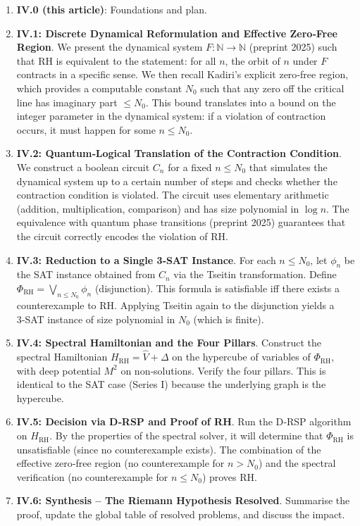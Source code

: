 \documentclass[11pt,a4paper]{article}
\begin{document}
\begin{enumerate}
\item \textbf{IV.0 (this article)}: Foundations and plan.
\item \textbf{IV.1: Discrete Dynamical Reformulation and Effective Zero‑Free Region}.  
   We present the dynamical system \(F: \mathbb{N} \to \mathbb{N}\) (preprint 2025) such that RH is equivalent to the statement: for all \(n\), the orbit of \(n\) under \(F\) contracts in a specific sense. We then recall Kadiri's explicit zero‑free region, which provides a computable constant \(N_0\) such that any zero off the critical line has imaginary part \(\le N_0\). This bound translates into a bound on the integer parameter in the dynamical system: if a violation of contraction occurs, it must happen for some \(n \le N_0\).
\item \textbf{IV.2: Quantum‑Logical Translation of the Contraction Condition}.  
   We construct a boolean circuit \(C_n\) for a fixed \(n \le N_0\) that simulates the dynamical system up to a certain number of steps and checks whether the contraction condition is violated. The circuit uses elementary arithmetic (addition, multiplication, comparison) and has size polynomial in \(\log n\). The equivalence with quantum phase transitions (preprint 2025) guarantees that the circuit correctly encodes the violation of RH.
\item \textbf{IV.3: Reduction to a Single 3‑SAT Instance}.  
   For each \(n \le N_0\), let \(\phi_n\) be the SAT instance obtained from \(C_n\) via the Tseitin transformation. Define \(\Phi_{\text{RH}} = \bigvee_{n\le N_0} \phi_n\) (disjunction). This formula is satisfiable iff there exists a counterexample to RH. Applying Tseitin again to the disjunction yields a 3‑SAT instance of size polynomial in \(N_0\) (which is finite).
\item \textbf{IV.4: Spectral Hamiltonian and the Four Pillars}.  
   Construct the spectral Hamiltonian \(H_{\text{RH}} = \hat{V} + \Delta\) on the hypercube of variables of \(\Phi_{\text{RH}}\), with deep potential \(M^2\) on non‑solutions. Verify the four pillars. This is identical to the SAT case (Series I) because the underlying graph is the hypercube.
\item \textbf{IV.5: Decision via D‑RSP and Proof of RH}.  
   Run the D‑RSP algorithm on \(H_{\text{RH}}\). By the properties of the spectral solver, it will determine that \(\Phi_{\text{RH}}\) is unsatisfiable (since no counterexample exists). The combination of the effective zero‑free region (no counterexample for \(n > N_0\)) and the spectral verification (no counterexample for \(n \le N_0\)) proves RH.
\item \textbf{IV.6: Synthesis – The Riemann Hypothesis Resolved}.  
   Summarise the proof, update the global table of resolved problems, and discuss the impact.
\end{enumerate}
\end{document}
